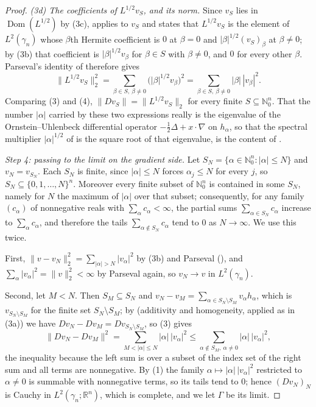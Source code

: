 \begin{proof}
\emph{(3d) The coefficients of $L^{1/2}v_S$, and its norm.}  Since $v_S$ lies in
$\operatorname{Dom}(L^{1/2})$ by (3c),  applies to $v_S$ and
states that $L^{1/2}v_S$ is the element of $L^2(\gamma_n)$ whose $\beta$th
Hermite coefficient is $0$ at $\beta = 0$ and $|\beta|^{1/2}(v_S)_\beta$ at
$\beta \neq 0$; by (3b) that coefficient is $|\beta|^{1/2}v_\beta$ for
$\beta \in S$ with $\beta \neq 0$, and $0$ for every other $\beta$.  Parseval's
identity of  therefore gives
\begin{equation*}
  \|L^{1/2}v_S\|_2^2
    = \sum_{\beta \in S,\ \beta \neq 0} \bigl(|\beta|^{1/2}v_\beta\bigr)^2
    = \sum_{\beta \in S,\ \beta \neq 0} |\beta|\,|v_\beta|^2 . \tag{4}
\end{equation*}
Comparing (3) and (4), $\|Dv_S\| = \|L^{1/2}v_S\|_2$ for every finite
$S \subseteq \mathbb{N}_0^n$.  That the number $|\alpha|$ carried by these two
expressions really is the eigenvalue of the Ornstein--Uhlenbeck differential
operator $-\tfrac12\Delta + x\cdot\nabla$ on $h_\alpha$, so that the spectral
multiplier $|\alpha|^{1/2}$ of  is the square root of that
eigenvalue, is the content of .

\emph{Step 4: passing to the limit on the gradient side.}
Let $S_N = \{\alpha \in \mathbb{N}_0^n : |\alpha| \leq N\}$ and $v_N = v_{S_N}$.
Each $S_N$ is finite, since $|\alpha| \leq N$ forces $\alpha_j \leq N$ for every
$j$, so $S_N \subseteq \{0,1,\ldots,N\}^n$.  Moreover every finite subset of
$\mathbb{N}_0^n$ is contained in some $S_N$, namely for $N$ the maximum of
$|\alpha|$ over that subset; consequently, for any family $(c_\alpha)$ of
nonnegative reals with $\sum_\alpha c_\alpha < \infty$, the partial sums
$\sum_{\alpha \in S_N} c_\alpha$ increase to $\sum_\alpha c_\alpha$, and therefore
the tails $\sum_{\alpha \notin S_N} c_\alpha$ tend to $0$ as $N \to \infty$.  We
use this twice.

First, $\|v - v_N\|_2^2 = \sum_{|\alpha| > N} |v_\alpha|^2$ by (3b) and Parseval
(), and $\sum_\alpha |v_\alpha|^2 = \|v\|_2^2 < \infty$ by
Parseval again, so $v_N \to v$ in $L^2(\gamma_n)$.

Second, let $M < N$.  Then $S_M \subseteq S_N$ and
$v_N - v_M = \sum_{\alpha \in S_N \setminus S_M} v_\alpha h_\alpha$, which is
$v_{S_N \setminus S_M}$ for the finite set $S_N \setminus S_M$; by
 (additivity and homogeneity, applied as in (3a)) we have
$Dv_N - Dv_M = D v_{S_N\setminus S_M}$, so (3) gives
\[
  \|Dv_N - Dv_M\|^2 = \sum_{M < |\alpha| \leq N} |\alpha|\,|v_\alpha|^2
    \leq \sum_{\alpha \notin S_M,\ \alpha \neq 0} |\alpha|\,|v_\alpha|^2 ,
\]
the inequality because the left sum is over a subset of the index set of the right
sum and all terms are nonnegative.  By (1) the family
$\alpha \mapsto |\alpha|\,|v_\alpha|^2$ restricted to $\alpha \neq 0$ is summable
with nonnegative terms, so its tails tend to $0$; hence $(Dv_N)_N$ is Cauchy in
$L^2(\gamma_n;\mathbb{R}^n)$, which is complete, and we let $\Gamma$ be its limit.


\end{proof}

